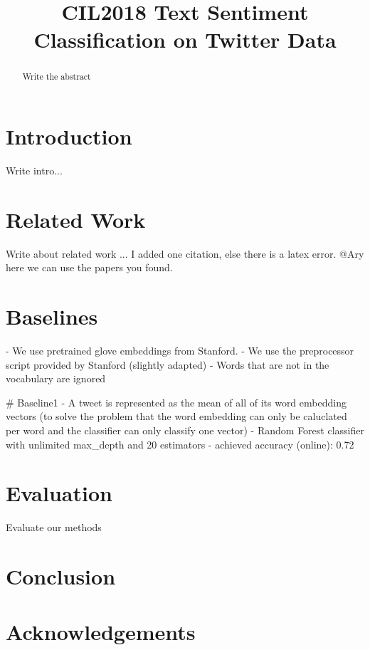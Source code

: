 \documentclass[conference]{IEEEtran}
\begin{document}
\title{CIL2018 Text Sentiment Classification on Twitter Data}



\author{
\and
{}
\and
{}
\and
{}
}
\maketitle
{}

\begin{abstract}
Write the abstract

\end{abstract}

\section{Introduction}
Write intro...

\section{Related Work}
\label{sec:related_work}

Write about related work \cite{go2016mastering}... I added one citation, else there is a latex error. @Ary here we can use the papers you found.

\section{Baselines}
- We use pretrained glove embeddings from Stanford.
- We use the preprocessor script provided by Stanford (slightly adapted)
- Words that are not in the vocabulary are ignored

# Baseline1
- A tweet is represented as the mean of all of its word embedding vectors (to solve the problem that the word embedding can only be caluclated per word and the classifier can only classify one vector)
- Random Forest classifier with unlimited max_depth and 20 estimators
- achieved accuracy (online): 0.72


\section{Evaluation}
\label{sec:evaluation}
Evaluate our methods

\section{Conclusion}

\section*{Acknowledgements}



\end{document}
